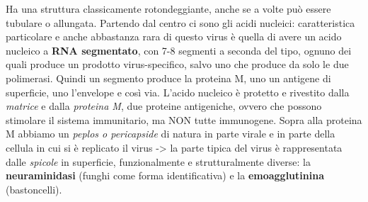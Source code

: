   Ha una struttura classicamente rotondeggiante, anche se a volte può
  essere tubulare o allungata. Partendo dal centro ci sono gli acidi
  nucleici: caratteristica particolare e anche abbastanza rara di questo
  virus è quella di avere un acido nucleico a \textbf{RNA segmentato},
  con 7-8 segmenti a seconda del tipo, ognuno dei quali produce un
  prodotto virus-specifico, salvo uno che produce da solo le due
  polimerasi. Quindi un segmento produce la proteina M, uno un antigene
  di superficie, uno l'envelope e così via. L'acido nucleico è protetto
  e rivestito dalla \emph{matrice} e dalla \emph{proteina M}, due
  proteine antigeniche, ovvero che possono stimolare il sistema
  immunitario, ma NON tutte immunogene. Sopra alla proteina M abbiamo un
  \emph{peplos o pericapside} di natura in parte virale e in parte della
  cellula in cui si è replicato il virus -> la parte tipica del virus è
  rappresentata dalle \emph{spicole} in superficie, funzionalmente e
  strutturalmente diverse: la \textbf{neuraminidasi} (funghi come forma
  identificativa) e la \textbf{emoagglutinina} (bastoncelli).
